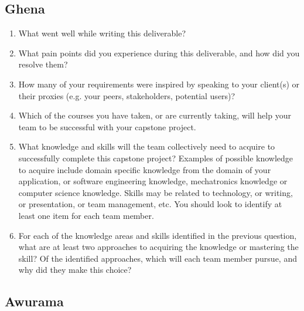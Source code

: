 \subsection*{Ghena}

\begin{enumerate}
  \item What went well while writing this deliverable? 
  \item What pain points did you experience during this deliverable, and how did
  you resolve them?
  \item How many of your requirements were inspired by speaking to your
  client(s) or their proxies (e.g. your peers, stakeholders, potential users)?
  \item Which of the courses you have taken, or are currently taking, will help
  your team to be successful with your capstone project.
  \item What knowledge and skills will the team collectively need to acquire to
  successfully complete this capstone project?  Examples of possible knowledge
  to acquire include domain specific knowledge from the domain of your
  application, or software engineering knowledge, mechatronics knowledge or
  computer science knowledge.  Skills may be related to technology, or writing,
  or presentation, or team management, etc.  You should look to identify at
  least one item for each team member.
  \item For each of the knowledge areas and skills identified in the previous
  question, what are at least two approaches to acquiring the knowledge or
  mastering the skill?  Of the identified approaches, which will each team
  member pursue, and why did they make this choice?
\end{enumerate}
\subsection*{Awurama}

